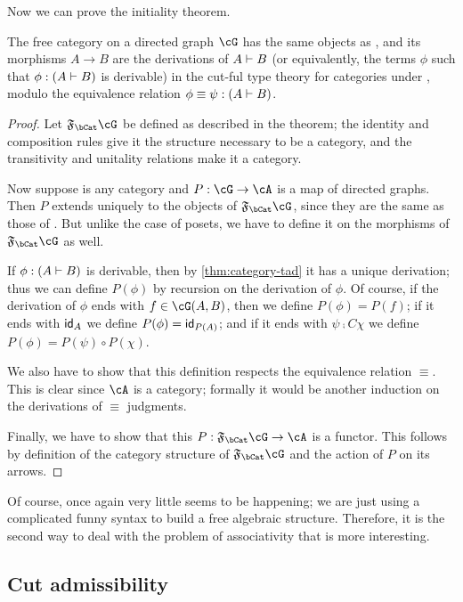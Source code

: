 Now we can prove the initiality theorem.

\begin{thm}\label{thm:category-initial-1}
  The free category on a directed graph $\cG$ has the same objects as \cG, and its morphisms $A\to B$ are the derivations of $A\vdash B$ (or equivalently, the terms $\phi$ such that $\phi :(A\vdash B)$ is derivable) in the cut-ful type theory for categories under \cG, modulo the equivalence relation $\phi\equiv \psi:(A\vdash B)$.
\end{thm}
\begin{proof}
  Let $\F\bCat\cG$ be defined as described in the theorem; the identity and composition rules give it the structure necessary to be a category, and the transitivity and unitality relations make it a category.

  Now suppose \cA is any category and $P:\cG\to\cA$ is a map of directed graphs.
  Then $P$ extends uniquely to the objects of $\F\bCat\cG$, since they are the same as those of \cG.
  But unlike the case of posets, we have to define it on the morphisms of $\F\bCat\cG$ as well.

  If $\phi :(A\vdash B)$ is derivable, then by \cref{thm:category-tad} it has a unique derivation; thus we can define $P(\phi)$ by recursion on the derivation of $\phi$.
  Of course, if the derivation of $\phi$ ends with $f\in\cG(A,B)$, then we define $P(\phi)=P(f)$; if it ends with $\mathsf{id}_A$ we define $P(\phi)=\mathsf{id}_{P(A)}$; and if it ends with $\psi\comp{C}\chi$ we define $P(\phi) = P(\psi)\circ P(\chi)$.

  We also have to show that this definition respects the equivalence relation $\equiv$.
  This is clear since $\cA$ is a category; formally it would be another induction on the derivations of $\equiv$ judgments.

  Finally, we have to show that this $P:\F\bCat\cG\to\cA$ is a functor.
  This follows by definition of the category structure of $\F\bCat\cG$ and the action of $P$ on its arrows.
\end{proof}

Of course, once again very little seems to be happening; we are just using a complicated funny syntax to build a free algebraic structure.
Therefore, it is the second way to deal with the problem of associativity that is more interesting.

\subsection{Cut admissibility}
\label{sec:category-cutadm}

